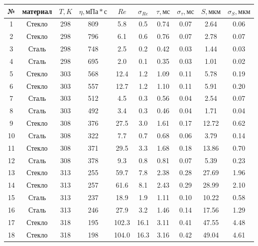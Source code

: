 \documentclass[a4paper, 12pt]{article}
\begin{document}
    \begin{table}[!ht]
        \centering
        \begin{tabular}{|c|c|c|c|c|c|c|c|c|c|}
            \hline
            № & материал & $T, K$ & $\eta, мПа * с$ & $Re$ & $\sigma_{Re}$ & $\tau, мс$ & $\sigma_{\tau}, мс$ & $S, мкм$ & $\sigma_S, мкм$ \\ \hline
            1 & Стекло & 298 & 809 & 5.8 & 0.5 & 0.74 & 0.07 & 2.64 & 0.06 \\ \hline
            2 & Стекло & 298 & 796 & 6.1 & 0.6 & 0.76 & 0.07 & 2.78 & 0.07 \\ \hline
            3 & Сталь & 298 & 748 & 2.5 & 0.2 & 0.42 & 0.03 & 1.44 & 0.03 \\ \hline
            4 & Сталь & 298 & 695 & 2.0 & 0.1 & 0.35 & 0.03 & 1.01 & 0.02 \\ \hline
            5 & Стекло & 303 & 568 & 12.4 & 1.2 & 1.09 & 0.11 & 5.78 & 0.19 \\ \hline
            6 & Стекло & 303 & 557 & 12.7 & 1.2 & 1.10 & 0.11 & 5.91 & 0.20 \\ \hline
            7 & Сталь & 303 & 512 & 4.5 & 0.3 & 0.56 & 0.04 & 2.54 & 0.07 \\ \hline
            8 & Сталь & 303 & 492 & 3.4 & 0.3 & 0.46 & 0.04 & 1.71 & 0.04 \\ \hline
            9 & Стекло & 308 & 376 & 27.5 & 3.0 & 1.61 & 0.17 & 12.72 & 0.62 \\ \hline
            10 & Сталь & 308 & 322 & 7.7 & 0.7 & 0.68 & 0.06 & 3.79 & 0.14 \\ \hline
            11 & Стекло & 308 & 371 & 29.5 & 3.3 & 1.68 & 0.18 & 13.86 & 0.70 \\ \hline
            12 & Сталь & 308 & 378 & 9.3 & 0.8 & 0.81 & 0.07 & 5.39 & 0.23 \\ \hline
            13 & Стекло & 313 & 255 & 59.7 & 7.8 & 2.38 & 0.28 & 27.69 & 1.96 \\ \hline
            14 & Стекло & 313 & 257 & 61.6 & 8.1 & 2.43 & 0.29 & 28.99 & 2.10 \\ \hline
            15 & Сталь & 313 & 237 & 18.9 & 1.9 & 1.11 & 0.10 & 10.22 & 0.58 \\ \hline
            16 & Сталь & 313 & 246 & 27.9 & 3.2 & 1.46 & 0.14 & 17.56 & 1.29 \\ \hline
            17 & Стекло & 318 & 195 & 102.3 & 16.1 & 3.11 & 0.41 & 47.55 & 4.48 \\ \hline
            18 & Стекло & 318 & 198 & 104.0 & 16.3 & 3.16 & 0.42 & 49.04 & 4.61 \\ \hline

\end{tabular}
\end{table}
\end{document}
